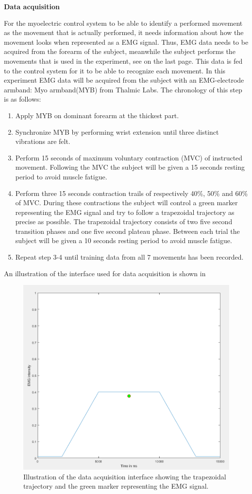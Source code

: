 \textbf{Data acquisition}

For the myoelectric control system to be able to identify a performed movement as the movement that is actually performed, it needs information about how the movement looks when represented as a EMG signal. Thus, EMG data needs to be acquired from the forearm of the subject, meanwhile the subject performs the movements that is used in the experiment, see  on the last page. This data is fed to the control system for it to be able to recognize each movement. In this experiment EMG data will be acquired from the subject with an EMG-electrode armband: Myo armband(MYB) from Thalmic Labs. The chronology of this step is as follows:

\begin{enumerate}
	\item Apply MYB on dominant forearm at the thickest part.
	\item Synchronize MYB by performing wrist extension until three distinct vibrations are felt.
	\item Perform 15 seconds of maximum voluntary contraction (MVC) of instructed movement. Following the MVC the subject will be given a 15 seconds resting period to avoid muscle fatigue.
	\item Perform three 15 seconds contraction trails of respectively 40\%, 50\% and 60\% of MVC. During these contractions the subject will control a green marker representing the EMG signal and try to follow a trapezoidal trajectory as precise as possible. The trapezoidal trajectory consists of two five second transition phases and one five second plateau phase. Between each trial the subject will be given a 10 seconds resting period to avoid muscle fatigue.
	\item Repeat step 3-4 until training data from all 7 movements has been recorded.
\end{enumerate}

An illustration of the interface used for data acquisition is shown in 

\begin{figure}[H]                 
	\includegraphics[width=.6\textwidth]{figures/xBackground/dataacqGUI}  
	\caption{Illustration of the data acquisition interface showing the trapezoidal trajectory and the green marker representing the EMG signal.}
	\label{fig:dataacqGUI} 
\end{figure}

